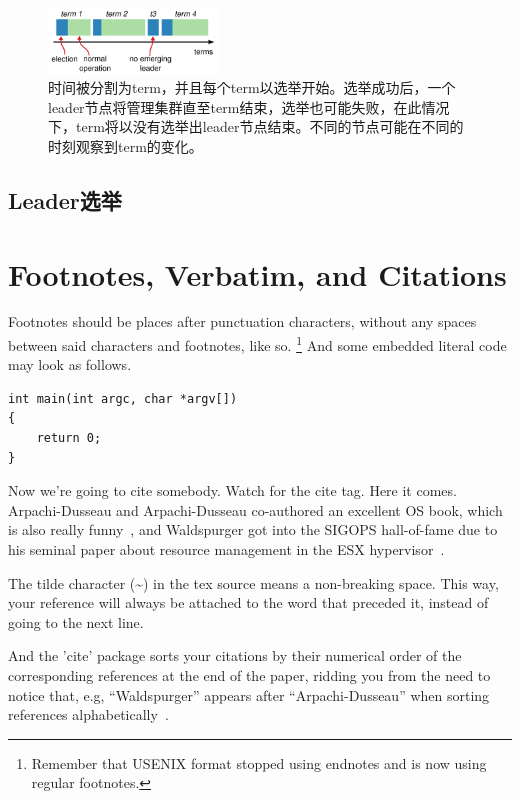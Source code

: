 \begin{figure}
\begin{center}
\includegraphics[width=0.4\textwidth]{imgs/fig_5.jpg}
\end{center}
\caption{\label{fig:term} 时间被分割为term，并且每个term以选举开始。选举成功后，一个leader节点将管理集群直至term结束，选举也可能失败，在此情况下，term将以没有选举出leader节点结束。不同的节点可能在不同的时刻观察到term的变化。}
\end{figure}

\subsection{Leader选举}
\label{sec:leader-election}

\section{Footnotes, Verbatim, and Citations}

Footnotes should be places after punctuation characters, without any
spaces between said characters and footnotes, like so.%
\footnote{Remember that USENIX format stopped using endnotes and is
  now using regular footnotes.} And some embedded literal code may
look as follows.

\begin{verbatim}
int main(int argc, char *argv[]) 
{
    return 0;
}
\end{verbatim}

Now we're going to cite somebody. Watch for the cite tag. Here it
comes. Arpachi-Dusseau and Arpachi-Dusseau co-authored an excellent OS
book, which is also really funny~\cite{arpachiDusseau18:osbook}, and
Waldspurger got into the SIGOPS hall-of-fame due to his seminal paper
about resource management in the ESX hypervisor~\cite{waldspurger02}.

The tilde character (\~{}) in the tex source means a non-breaking
space. This way, your reference will always be attached to the word
that preceded it, instead of going to the next line.

And the 'cite' package sorts your citations by their numerical order
of the corresponding references at the end of the paper, ridding you
from the need to notice that, e.g, ``Waldspurger'' appears after
``Arpachi-Dusseau'' when sorting references
alphabetically~\cite{waldspurger02,arpachiDusseau18:osbook}. 

